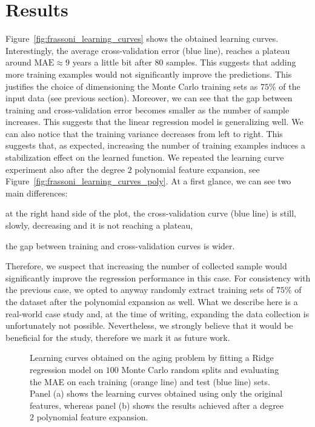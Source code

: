 \section{Results} \label{sec:frassoni_results}
Figure~\ref{fig:frassoni_learning_curves} shows the obtained learning curves. Interestingly, the average cross-validation error (blue line), reaches a plateau around $\text{MAE} \approx 9$ years a little bit after $80$ samples. This suggests that adding more training examples would not significantly improve the predictions. This justifies the choice of dimensioning the Monte Carlo training sets as $75\%$ of the input data (see previous section).
Moreover, we can see that the gap between training and cross-validation error becomes smaller as the number of sample increases. This suggests that the linear regression model is generalizing well. We can also notice that the training variance decreases from left to right. This suggests that, as expected, increasing the number of training examples induces a stabilization effect on the learned function.
We repeated the learning curve experiment also after the degree $2$ polynomial feature expansion, see Figure~\ref{fig:frassoni_learning_curves_poly}. At a first glance, we can see two main differences:
\begin{enumerate*}[label=(\roman*)]
	\item at the right hand side of the plot, the cross-validation curve (blue line) is still, slowly, decreasing and it is not reaching a plateau,
	\item the gap between training and cross-validation curves is wider.
\end{enumerate*}
Therefore, we suspect that increasing the number of collected sample would significantly improve the regression performance in this case.
For consistency with the previous case, we opted to anyway randomly extract training sets of $75\%$ of the dataset after the polynomial expansion as well.
What we describe here is a real-world case study and, at the time of writing, expanding the data collection is unfortunately not possible. Nevertheless, we strongly believe that it would be beneficial for the study, therefore we mark it as future work.


\begin{figure}[]
	\centering
	\caption{Learning curves obtained on the aging problem by fitting a Ridge regression model on $100$ Monte Carlo random splits and evaluating the MAE on each training (orange line) and test (blue line) sets. Panel (a) shows the learning curves obtained using only the original features, whereas panel (b) shows the results achieved after a degree $2$ polynomial feature expansion. }
\end{figure}

